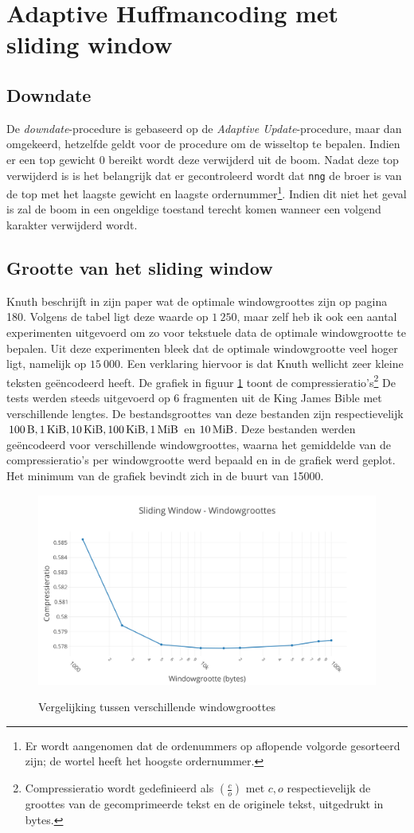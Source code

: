 \section{Adaptive Huffmancoding met sliding window}

\subsection{Downdate}
De \emph{downdate}-procedure is gebaseerd op de \emph{Adaptive Update}-procedure, maar dan omgekeerd, hetzelfde geldt voor de procedure om de wisseltop te bepalen. Indien er een top gewicht $0$ bereikt wordt deze verwijderd uit de boom. Nadat deze top verwijderd is is het belangrijk dat er gecontroleerd wordt dat \texttt{nng} de broer is van de top met het laagste gewicht en laagste ordernummer\footnote{Er wordt aangenomen dat de ordenummers op aflopende volgorde gesorteerd zijn; de wortel heeft het hoogste ordernummer.}. Indien dit niet het geval is zal de boom in een ongeldige toestand terecht komen wanneer een volgend karakter verwijderd wordt. 

\subsection{Grootte van het sliding window}
Knuth beschrijft in zijn paper \cite{knuthhuffman} wat de optimale windowgroottes zijn op pagina 180. Volgens de tabel ligt deze waarde op \texttt{$1\ 250$}, maar zelf heb ik ook een aantal experimenten uitgevoerd om zo voor tekstuele data de optimale windowgrootte te bepalen. Uit deze experimenten bleek dat de optimale windowgrootte veel hoger ligt, namelijk op \texttt{$15\ 000$}. Een verklaring hiervoor is dat Knuth wellicht zeer kleine teksten ge\"encodeerd heeft. De grafiek in figuur \ref{fig:sliding-windowsizes} toont de compressieratio's\footnote{Compressieratio wordt gedefinieerd als $(\frac{c}{o})$ met $c,o$ respectievelijk de groottes van de gecomprimeerde tekst en de originele tekst, uitgedrukt in bytes.} De tests werden steeds uitgevoerd op 6 fragmenten uit de King James Bible \cite{gutenbergbible} met verschillende lengtes. De bestandsgroottes van deze bestanden zijn respectievelijk $\SI{100}{\byte}, \SI{1}{\kibi\byte}, \SI{10}{\kibi\byte}, \SI{100}{\kibi\byte}, \SI{1}{\mebi\byte}$ en $\SI{10}{\mebi\byte}$. Deze bestanden werden ge\"encodeerd voor verschillende windowgroottes, waarna het gemiddelde van de compressieratio's per windowgrootte werd bepaald en in de grafiek werd geplot. Het minimum van de grafiek bevindt zich in de buurt van \SI{15000}{\byte}.

\begin{figure}[h]
	\centering
	\includegraphics[width=0.9\linewidth]{resources/sliding-window.png}
	\label{fig:sliding-windowsizes}
	\caption{Vergelijking tussen verschillende windowgroottes}
\end{figure}